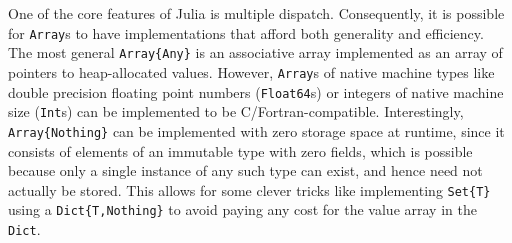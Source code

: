 \documentclass[preprint]{sigplanconf}
\newcommand{\code}[1]{\texttt{#1}}
\begin{document}
One of the core features of Julia is multiple dispatch. Consequently, it is
possible for \code{Array}s to have implementations that afford both generality
and efficiency. The most general \code{Array\{Any\}} is an associative array
implemented as an array of pointers to heap-allocated values. However,
\code{Array}s of native machine types like double precision floating point
numbers (\code{Float64}s) or integers of native machine size (\code{Int}s) can
be implemented to be C/Fortran-compatible. Interestingly,
\code{Array\{Nothing\}} can be implemented with zero storage space at runtime,
since it consists of elements of an immutable type with zero fields, which is
possible because only a single instance of any such type can exist, and hence
need not actually be stored. This allows for some clever tricks like
implementing \code{Set\{T\}} using a \code{Dict\{T,Nothing\}} to avoid paying
any cost for the value array in the \code{Dict}.




\end{document}
